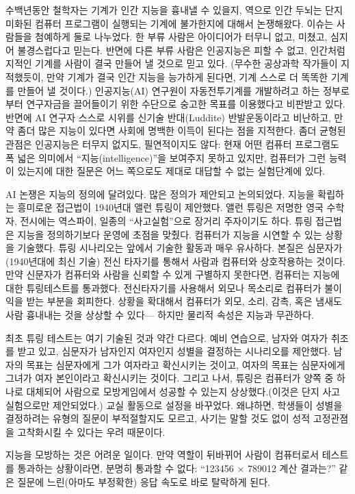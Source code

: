 \documentclass[]{article}
\begin{document}
수백년동안 철학자는 기계가 인간 지능을 흉내낼 수 있을지, 역으로 인간
두뇌는 단지 미화된 컴퓨터 프로그램이 실행되는 기계에 불가한지에 대해서
논쟁해왔다. 이슈는 사람들을 첨예하게 둘로 나누었다. 한 부류 사람은
아이디어가 터무니 없고, 미쳤고, 심지어 불경스럽다고 믿는다. 반면에 다른
부류 사람은 인공지능은 피할 수 없고, 인간처럼 지적인 기계를 사람이 결국
만들어 낼 것으로 믿고 있다. (무수한 공상과학 작가들이 지적했듯이, 만약
기계가 결국 인간 지능을 능가하게 된다면, 기계 스스로 더 똑똑한 기계를
만들어 낼 것이다.) 인공지능(AI) 연구원이 자동전투기계를 개발하려고 하는
정부로부터 연구자금을 끌어들이기 위한 수단으로 숭고한 목표를 이용했다고
비판받고 있다. 반면에 AI 연구자 스스로 시위를 신기술 반대(Luddite)
반발운동이라고 비난하고, 만약 좀더 많은 지능이 있다면 사회에 명백한
이득이 된다는 점을 지적한다. 좀더 균형된 관점은 인공지능은 터무지
없지도, 필연적이지도 않다: 현재 어떤 컴퓨터 프로그램도 폭 넓은 의미에서
``지능(intelligence)''을 보여주지 못하고 있지만, 컴퓨터가 그런 능력이
있는지에 대한 질문은 어느 쪽으로도 제대로 대답할 수 없는 실험단계에
있다.

AI 논쟁은 지능의 정의에 달려있다. 많은 정의가 제안되고 논의되었다.
지능을 확립하는 흥미로운 접근법이 1940년대 앨런 튜링이 제안했다. 앨런
튜링은 저명한 영국 수학자, 전시에는 역스파이, 일종의 ``사고실험''으로
장거리 주자이기도 하다. 튜링 접근법은 지능을 정의하기보다 운영에 초점을
맞췄다. 컴퓨터가 지능을 시연할 수 있는 상황을 기술했다. 튜링 시나리오는
앞에서 기술한 활동과 매우 유사하다. 본질은 심문자가 (1940년대에 최신
기술) 전신 타자기를 통해서 사람과 컴퓨터와 상호작용하는 것이다. 만약
신문자가 컴퓨터와 사람을 신뢰할 수 있게 구별하지 못한다면, 컴퓨터는
지능에 대한 튜링테스트를 통과했다. 전신타자기를 사용해서 외모나 목소리로
컴퓨터가 불이익을 받는 부분을 회피한다. 상황을 확대해서 컴퓨터가 외모,
소리, 감촉, 혹은 냄새도 사람 흉내내는 것을 상상할 수 있다--- 하지만
물리적 속성은 지능과 무관하다.

최초 튜링 테스트는 여기 기술된 것과 약간 다르다. 예비 연습으로, 남자와
여자가 취조를 받고 있고, 심문자가 남자인지 여자인지 성별을 결정하는
시나리오를 제안했다. 남자의 목표는 심문자에게 그가 여자라고 확신시키는
것이고, 여자의 목표는 심문자에게 그녀가 여자 본인이라고 확신시키는
것이다. 그리고 나서, 튜링은 컴퓨터가 양쪽 중 하나로 대체되어 사람으로
모방게임에서 성공할 수 있는지 상상했다.(이것은 단지 사고 실험으로만
제안되었다.) 교실 활동으로 설정을 바꾸었다. 왜냐하면, 학생들이 성별을
결정하려는 유형의 질문이 부적절할지도 모르고, 사기는 말할 것도 없이 성적
고정관졈을 고착화시킬 수 있다는 우려 때문이다.

지능을 모방하는 것은 어려운 일이다. 만약 역할이 뒤바뀌어 사람이
컴퓨터로서 테스트를 통과하는 상황이라면, 분명히 통과할 수 없다: ``123456
× 789012 계산 결과는?'' 같은 질문에 느린(아마도 부정확한) 응답 속도로
바로 탈락하게 된다.
\end{document}
